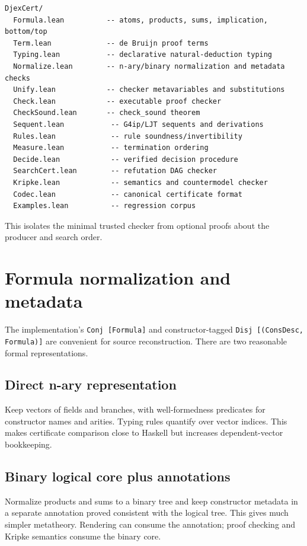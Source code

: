 \documentclass[11pt,letterpaper,openany]{report}
\theoremstyle{definition}
\theoremstyle{remark}
\newcommand{\code}[1]{\texttt{#1}}
\begin{document}
\begin{lstlisting}[language=LeanFour,caption={Suggested formal package layout.}]
DjexCert/
  Formula.lean          -- atoms, products, sums, implication, bottom/top
  Term.lean             -- de Bruijn proof terms
  Typing.lean           -- declarative natural-deduction typing
  Normalize.lean        -- n-ary/binary normalization and metadata checks
  Unify.lean            -- checker metavariables and substitutions
  Check.lean            -- executable proof checker
  CheckSound.lean       -- check_sound theorem
  Sequent.lean           -- G4ip/LJT sequents and derivations
  Rules.lean             -- rule soundness/invertibility
  Measure.lean           -- termination ordering
  Decide.lean            -- verified decision procedure
  SearchCert.lean        -- refutation DAG checker
  Kripke.lean            -- semantics and countermodel checker
  Codec.lean             -- canonical certificate format
  Examples.lean          -- regression corpus
\end{lstlisting}

This isolates the minimal trusted checker from optional proofs about the producer and search order.

\section{Formula normalization and metadata}

The implementation's \code{Conj [Formula]} and constructor-tagged \code{Disj [(ConsDesc, Formula)]} are convenient for source reconstruction. There are two reasonable formal representations.

\subsection{Direct n-ary representation}

Keep vectors of fields and branches, with well-formedness predicates for constructor names and arities. Typing rules quantify over vector indices. This makes certificate comparison close to Haskell but increases dependent-vector bookkeeping.

\subsection{Binary logical core plus annotations}

Normalize products and sums to a binary tree and keep constructor metadata in a separate annotation proved consistent with the logical tree. This gives much simpler metatheory. Rendering can consume the annotation; proof checking and Kripke semantics consume the binary core.
\end{document}
